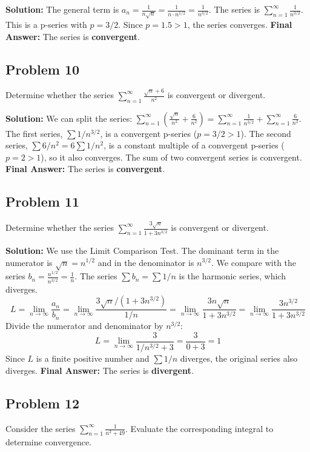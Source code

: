 \documentclass{article}
\begin{document}
\textbf{Solution:}
The general term is $a_n = \frac{1}{n\sqrt{n}} = \frac{1}{n \cdot n^{1/2}} = \frac{1}{n^{3/2}}$.
The series is $\sum_{n=1}^{\infty} \frac{1}{n^{3/2}}$.
This is a p-series with $p=3/2$. Since $p=1.5>1$, the series converges.
\textbf{Final Answer:} The series is \textbf{convergent}.

\subsection*{Problem 10}
Determine whether the series $\sum_{n=1}^{\infty} \frac{\sqrt{n}+6}{n^2}$ is convergent or divergent.

\textbf{Solution:}
We can split the series: $\sum_{n=1}^{\infty} \left( \frac{\sqrt{n}}{n^2} + \frac{6}{n^2} \right) = \sum_{n=1}^{\infty} \frac{1}{n^{3/2}} + \sum_{n=1}^{\infty} \frac{6}{n^2}$.
The first series, $\sum 1/n^{3/2}$, is a convergent p-series ($p=3/2>1$).
The second series, $\sum 6/n^2 = 6 \sum 1/n^2$, is a constant multiple of a convergent p-series ($p=2>1$), so it also converges.
The sum of two convergent series is convergent.
\textbf{Final Answer:} The series is \textbf{convergent}.

\subsection*{Problem 11}
Determine whether the series $\sum_{n=1}^{\infty} \frac{3\sqrt{n}}{1+3n^{3/2}}$ is convergent or divergent.

\textbf{Solution:}
We use the Limit Comparison Test. The dominant term in the numerator is $\sqrt{n} = n^{1/2}$ and in the denominator is $n^{3/2}$.
We compare with the series $b_n = \frac{n^{1/2}}{n^{3/2}} = \frac{1}{n}$. The series $\sum b_n = \sum 1/n$ is the harmonic series, which diverges.
\[ L = \lim_{n\to\infty} \frac{a_n}{b_n} = \lim_{n\to\infty} \frac{3\sqrt{n}/(1+3n^{3/2})}{1/n} = \lim_{n\to\infty} \frac{3n\sqrt{n}}{1+3n^{3/2}} = \lim_{n\to\infty} \frac{3n^{3/2}}{1+3n^{3/2}} \]
Divide the numerator and denominator by $n^{3/2}$:
\[ L = \lim_{n\to\infty} \frac{3}{1/n^{3/2}+3} = \frac{3}{0+3} = 1 \]
Since $L$ is a finite positive number and $\sum 1/n$ diverges, the original series also diverges.
\textbf{Final Answer:} The series is \textbf{divergent}.

\subsection*{Problem 12}
Consider the series $\sum_{n=1}^{\infty} \frac{1}{n^2+49}$. Evaluate the corresponding integral to determine convergence.
\end{document}
